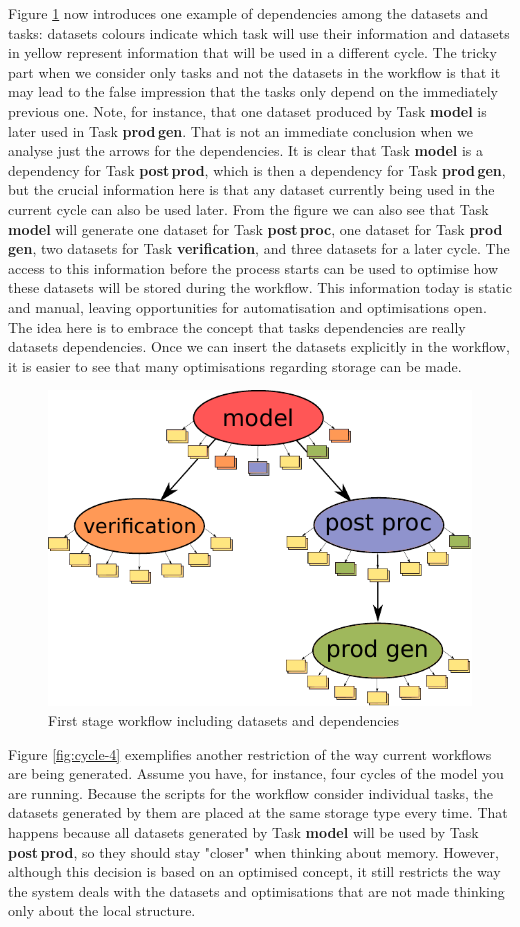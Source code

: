 \documentclass[a4paper]{article}
\begin{document}
{{{{Figure \ref{fig:cycle-io-dep} now introduces one example of dependencies among the datasets and tasks: datasets colours indicate which task will use their information and datasets in yellow represent information that will be used in a different cycle. The tricky part when we consider only tasks and not the datasets in the workflow is that it may lead to the false impression that the tasks only depend on the immediately previous one. Note, for instance, that one dataset produced by Task \textbf{model} is later used in Task \textbf{prod\,gen}. That is not an immediate conclusion when we analyse just the arrows for the dependencies. It is clear that Task \textbf{model} is a dependency for Task \textbf{post\,prod}, which is then a dependency for Task \textbf{prod\,gen}, but the crucial information here is that any dataset currently being used in the current cycle can also be used later. From the figure we can also see that Task \textbf{model} will generate one dataset for Task \textbf{post\,proc}, one dataset for Task \textbf{prod\,gen}, two datasets for Task \textbf{verification}, and three datasets for a later cycle.
The access to this information before the process starts can be used to optimise how these datasets will be stored during the workflow. This information today is static and manual, leaving opportunities for automatisation and optimisations open.
The idea here is to embrace the concept that tasks dependencies are really datasets dependencies. Once we can insert the datasets explicitly in the workflow, it is easier to see that many optimisations regarding storage can be made.

\begin{figure}[H]
  \centering
  \includegraphics[width=0.6\columnwidth]{cycle-io-dep}
  \caption{First stage workflow including datasets and dependencies}
  \label{fig:cycle-io-dep}
\end{figure}

Figure \ref{fig:cycle-4} exemplifies another restriction of the way current workflows are being generated. Assume you have, for instance, four cycles of the model you are running. Because the scripts for the workflow consider individual tasks, the datasets generated by them are placed at the same storage type every time. That happens because all datasets generated by Task \textbf{model} will be used by Task \textbf{post\,prod}, so they should stay "closer" when thinking about memory. However, although this decision is based on an optimised concept, it still restricts the way the system deals with the datasets and optimisations that are not made thinking only about the local structure.

}}}}
\end{document}
